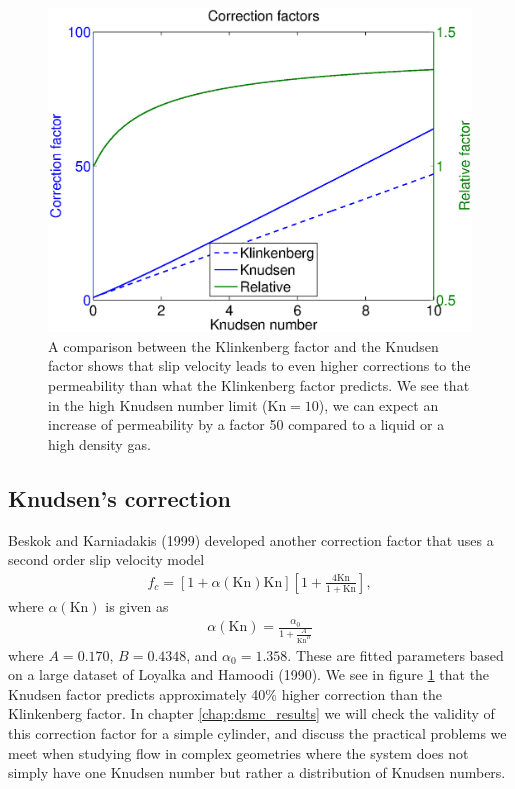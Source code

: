 \begin{figure}[h]
\begin{center}
\includegraphics[width=\textwidth, trim=0cm 0cm 0cm 0cm, clip]{figures/klinkenberg.eps}
\end{center}
\caption{A comparison between the Klinkenberg factor and the Knudsen factor shows that slip velocity leads to even higher corrections to the permeability than what the Klinkenberg factor predicts. We see that in the high Knudsen number limit ($\text{Kn}=10$), we can expect an increase of permeability by a factor 50 compared to a liquid or a high density gas.}
\label{fig:klinkenberg_correction_factor}
\end{figure}

\subsection{Knudsen's correction}
\label{sec:knudsen_correction}
Beskok and Karniadakis (1999) developed another correction factor that uses a second order slip velocity model 
\begin{align}
	\label{eq:knudsen_correction}
	f_c = [1 + \alpha(\text{Kn})\text{Kn}]\left[1 + \frac{4\text{Kn}}{ 1 + \text{Kn}}\right],
\end{align}
where $\alpha(\text{Kn})$ is given as\cite{civan2010effective}
\begin{align}
	\alpha(\text{Kn}) = \frac{\alpha_0}{1 + \frac{A}{\text{Kn}^B}}
\end{align} 
where $A=0.170$, $B=0.4348$, and $\alpha_0=1.358$. These are fitted parameters based on a large dataset of Loyalka and Hamoodi (1990). We see in figure \ref{fig:klinkenberg_correction_factor} that the Knudsen factor predicts approximately 40\% higher correction than the Klinkenberg factor. In chapter \ref{chap:dsmc_results} we will check the validity of this correction factor for a simple cylinder, and discuss the practical problems we meet when studying flow in complex geometries where the system does not simply have one Knudsen number but rather a distribution of Knudsen numbers.